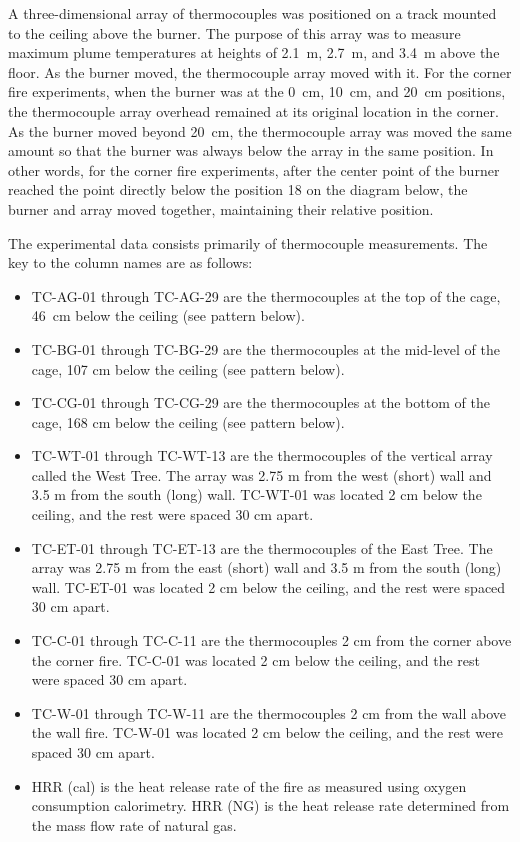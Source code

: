 A three-dimensional array of thermocouples was positioned on a track mounted to the ceiling above the burner. The purpose of this array was to measure maximum plume temperatures at heights of 2.1~m, 2.7~m, and 3.4~m above the floor. As the burner moved, the thermocouple array moved with it. For the corner fire experiments, when the burner was at the 0~cm, 10~cm, and 20~cm positions, the thermocouple array overhead remained at its original location in the corner. As the burner moved beyond 20~cm, the thermocouple array was moved the same amount so that the burner was always below the array in the same position. In other words, for the corner fire experiments, after the center point of the burner reached the point directly below the position 18 on the diagram below, the burner and array moved together, maintaining their relative position.

The experimental data consists primarily of thermocouple measurements. The key to the column names are as follows:
\begin{itemize}
\item TC-AG-01 through TC-AG-29 are the thermocouples at the top of the cage, 46~cm below the ceiling (see pattern below).
\item TC-BG-01 through TC-BG-29 are the thermocouples at the mid-level of the cage, 107 cm below the ceiling (see pattern below).
\item TC-CG-01 through TC-CG-29 are the thermocouples at the bottom of the cage, 168 cm below the ceiling (see pattern below).
\item TC-WT-01 through TC-WT-13 are the thermocouples of the vertical array called the West Tree. The array was 2.75 m from the west (short) wall and 3.5 m from the south (long) wall. TC-WT-01 was located 2 cm below the ceiling, and the rest were spaced 30 cm apart.
\item TC-ET-01 through TC-ET-13 are the thermocouples of the East Tree. The array was 2.75 m from the east (short) wall and 3.5 m from the south (long) wall. TC-ET-01 was located 2 cm below the ceiling, and the rest were spaced 30 cm apart.
\item TC-C-01 through TC-C-11 are the thermocouples 2 cm from the corner above the corner fire. TC-C-01 was located 2 cm below the ceiling, and the rest were spaced 30 cm apart.
\item TC-W-01 through TC-W-11 are the thermocouples 2 cm from the wall above the wall fire. TC-W-01 was located 2 cm below the ceiling, and the rest were spaced 30 cm apart.
\item HRR (cal) is the heat release rate of the fire as measured using oxygen consumption calorimetry. HRR (NG) is the heat release rate determined from the mass flow rate of natural gas.
\end{itemize}

